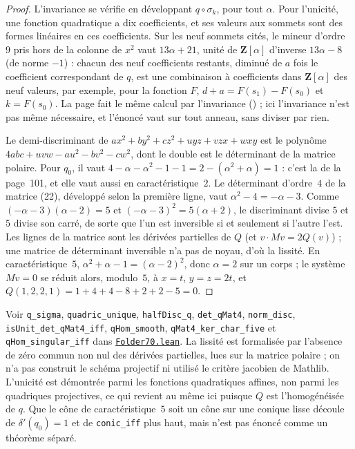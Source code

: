 \begin{proof}
L'invariance se vérifie en développant $q \circ \sigma_k$, pour tout $\alpha$. Pour l'unicité, une fonction quadratique a dix coefficients, et ses valeurs aux sommets sont des formes linéaires en ces coefficients. Sur les neuf sommets cités, le mineur d'ordre~$9$ pris hors de la colonne de $x^2$ vaut $13\alpha + 21$, unité de $\mathbf Z[\alpha]$ d'inverse $13\alpha - 8$ (de norme $-1$) : chacun des neuf coefficients restants, diminué de $a$ fois le coefficient correspondant de $q$, est une combinaison à coefficients dans $\mathbf Z[\alpha]$ des neuf valeurs, par exemple, pour la fonction $F$, $d + a = F(s_1) - F(s_0)$ et $k = F(s_0)$. La page fait le même calcul par l'invariance () ; ici l'invariance n'est pas même nécessaire, et l'énoncé vaut sur tout anneau, sans diviser par rien.

Le demi-discriminant de $a x^2 + b y^2 + c z^2 + u yz + v zx + w xy$ est le polynôme $4abc + uvw - au^2 - bv^2 - cw^2$, dont le double est le déterminant de la matrice polaire. Pour $q_0$, il vaut $4 - \alpha - \alpha^2 - 1 - 1 = 2 - (\alpha^2 + \alpha) = 1$ : c'est la  de la page~101, et elle vaut aussi en caractéristique~$2$. Le déterminant d'ordre~$4$ de la matrice (22), développé selon la première ligne, vaut $\alpha^2 - 4 = -\alpha - 3$. Comme $(-\alpha - 3)(\alpha - 2) = 5$ et $(-\alpha - 3)^2 = 5(\alpha + 2)$, le discriminant divise $5$ et $5$ divise son carré, de sorte que l'un est inversible si et seulement si l'autre l'est. Les lignes de la matrice sont les dérivées partielles de $Q$ (et $v \cdot Mv = 2Q(v)$) ; une matrice de déterminant inversible n'a pas de noyau, d'où la lissité. En caractéristique~$5$, $\alpha^2 + \alpha - 1 = (\alpha - 2)^2$, donc $\alpha = 2$ sur un corps ; le système $Mv = 0$ se réduit alors, modulo~$5$, à $x = t$, $y = z = 2t$, et $Q(1, 2, 2, 1) = 1 + 4 + 4 - 8 + 2 + 2 - 5 = 0$.
\end{proof}

\begin{remarque}
Voir \texttt{q\_sigma}, \texttt{quadric\_unique}, \texttt{halfDisc\_q}, \texttt{det\_qMat4}, \texttt{norm\_disc}, \texttt{isUnit\_det\_qMat4\_iff}, \texttt{qHom\_smooth}, \texttt{qMat4\_ker\_char\_five} et \texttt{qHom\_singular\_iff} dans \href{\leanblob/Geometry/Folder70.lean}{\texttt{Folder70.\allowbreak{}lean}}. La lissité est formalisée par l'absence de zéro commun non nul des dérivées partielles, lues sur la matrice polaire ; on n'a pas construit le schéma projectif ni utilisé le critère jacobien de Mathlib. L'unicité est démontrée parmi les fonctions quadratiques affines, non parmi les quadriques projectives, ce qui revient au même ici puisque $Q$ est l'homogénéisée de $q$. Que le cône de caractéristique~$5$ soit un cône sur une conique lisse découle de $\delta'(q_0) = 1$ et de \texttt{conic\_iff} plus haut, mais n'est pas énoncé comme un théorème séparé.
\end{remarque}

